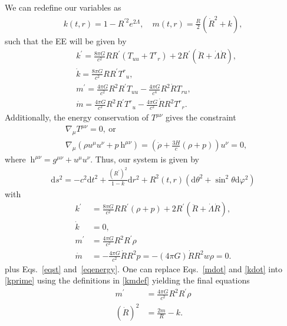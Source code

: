 \documentclass[a4paper,11pt]{article}
\begin{document}
We can redefine our variables as
\begin{align}
	\label{kmdef}
	k(t, r)=1-R^{\prime 2} e^{2 \Lambda}, \quad m(t, r)=\frac{R}{2}\left(\dot{R}^2+k\right)
	,\end{align}
such that the EE will be given by 
\begin{align}
	&k^{\prime} =\frac{8\pi  G}{c^2} RR^{\prime}\left(T_{uu}+T^{r}{}_{r}\right)+2R^{\prime}\left(\ddot{R}+\dot{\Lambda}\dot{R}\right),  \\
	&\dot{k} =\frac{8\pi  G}{c^2} RR^{\prime}T^{r}{}_{u},  \\
	&m^{\prime} =\frac{4\pi  G}{c^2} R^{2}R^{\prime}T_{uu}-\frac{4\pi  G}{c^4} R^{2}\dot{R}T_{ru},  \\
	&\dot{m} =\frac{4\pi  G}{c^2} R^{2}R^{\prime}T^{r}{}_{u}-\frac{4\pi  G}{c^2}\dot{R}R^{2}T^{r}{}_{r} 
	.\end{align}
Additionally, the energy conservation of $T^{\mu\nu}$ gives the constraint
\begin{align}
	\label{eqenergy}
	&\nabla_{\mu}T^{\mu\nu}=0,~\text{or}\nonumber\\
	&\nabla_\mu(\rho u^\mu u^\nu+p\mathrm{~h}^{\mu\nu})=\left(\dot{\rho}+\frac{3H}{c}(\rho+p)\right)u^\nu=0
	,\end{align}
where $\mathrm{~h}^{\mu\nu} = g^{\mu\nu} + u^\mu u^\nu $.
Thus, our system is given by
\begin{align}
	\label{metricgen}
	\mathrm{d} s^2=-c^2\mathrm{d} t^2+\frac{(R^\prime)^{2}}{1 - k} \mathrm{d} r^2+R^2(t, r)\left(\mathrm{d} \theta^2+\sin ^2 \theta \mathrm{d} \varphi^2\right)
\end{align}
with 
\begin{align}
	\label{kprime}
	k^{\prime}& =\frac{8\pi  G}{c^2} RR^{\prime}\left(\rho+p\right)+2R^{\prime}\left(\ddot{R}+\dot{\Lambda}\dot{R}\right),  \\
	\label{kdot}
	\dot{k}& = 0,  \\
	m^{\prime}& =\frac{4\pi  G}{c^2} R^{2}R^{\prime}\rho  \\
	\label{mdot}
	\dot{m}& =-\frac{4\pi  G}{c^2}\dot{R}R^{2}p = -(4\pi  G)\dot{R}R^{2} w\rho = 0. 
\end{align}
plus Eqs.~\eqref{eqst} and~\eqref{eqenergy}. One can replace Eqs.~\eqref{mdot} and \eqref{kdot} into \eqref{kprime} using the definitions in \eqref{kmdef} yielding the final equations
\begin{align}
	\label{mprime}
	m^{\prime}& =\frac{4\pi G}{c^2} R^{2}R^{\prime}\rho  \\
	\label{rdot}
	(\dot{R})^2 &= \frac{2m}{R}-k
	.\end{align}
\end{document}
